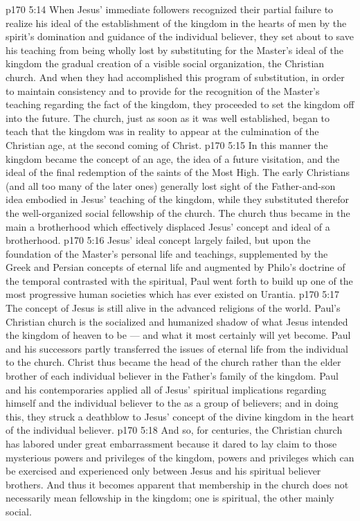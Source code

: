 \vs p170 5:14 When Jesus’ immediate followers recognized their partial failure to realize his ideal of the establishment of the kingdom in the hearts of men by the spirit’s domination and guidance of the individual believer, they set about to save his teaching from being wholly lost by substituting for the Master’s ideal of the kingdom the gradual creation of a visible social organization, the Christian church. And when they had accomplished this program of substitution, in order to maintain consistency and to provide for the recognition of the Master’s teaching regarding the fact of the kingdom, they proceeded to set the kingdom off into the future. The church, just as soon as it was well established, began to teach that the kingdom was in reality to appear at the culmination of the Christian age, at the second coming of Christ.
\vs p170 5:15 In this manner the kingdom became the concept of an age, the idea of a future visitation, and the ideal of the final redemption of the saints of the Most High. The early Christians (and all too many of the later ones) generally lost sight of the Father\hyp{}and\hyp{}son idea embodied in Jesus’ teaching of the kingdom, while they substituted therefor the well\hyp{}organized social fellowship of the church. The church thus became in the main a  brotherhood which effectively displaced Jesus’ concept and ideal of a  brotherhood.
\vs p170 5:16 Jesus’ ideal concept largely failed, but upon the foundation of the Master’s personal life and teachings, supplemented by the Greek and Persian concepts of eternal life and augmented by Philo’s doctrine of the temporal contrasted with the spiritual, Paul went forth to build up one of the most progressive human societies which has ever existed on Urantia.
\vs p170 5:17 The concept of Jesus is still alive in the advanced religions of the world. Paul’s Christian church is the socialized and humanized shadow of what Jesus intended the kingdom of heaven to be --- and what it most certainly will yet become. Paul and his successors partly transferred the issues of eternal life from the individual to the church. Christ thus became the head of the church rather than the elder brother of each individual believer in the Father’s family of the kingdom. Paul and his contemporaries applied all of Jesus’ spiritual implications regarding himself and the individual believer to the  as a group of believers; and in doing this, they struck a deathblow to Jesus’ concept of the divine kingdom in the heart of the individual believer.
\vs p170 5:18 And so, for centuries, the Christian church has labored under great embarrassment because it dared to lay claim to those mysterious powers and privileges of the kingdom, powers and privileges which can be exercised and experienced only between Jesus and his spiritual believer brothers. And thus it becomes apparent that membership in the church does not necessarily mean fellowship in the kingdom; one is spiritual, the other mainly social.

